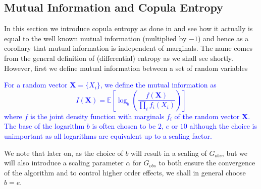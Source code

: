 \documentclass[../Thesis.tex]{subfiles}
\begin{document}
\subsection{Mutual Information and Copula Entropy}
In this section we introduce copula entropy as done in \cite{Nonparametric-copula-entropy-and-network-deconvolution-method-for-causal-discovery-in-complex-manufacturing-systems} and see how it actually is equal to the well known mutual information (multiplied by $-1$) and hence as a corollary that mutual information is independent of marginals. The name comes from the general definition of (differential) entropy as we shall see shortly. However, first we define mutual information between a set of random variables
\textcolor{blue}{
    \begin{definition}\label{def:mutual information}
        For a random vector $\boldsymbol{X} = \{X_i\}$, we define the mutual information as
        $$I(\boldsymbol{X}) = \mathbb{E}\left[\log_b \left(\frac{f(\boldsymbol X)}{\prod_i f_i (X_i)}\right)\right]$$
        where $f$ is the joint density function with marginals $f_i$ of the random vector $\boldsymbol{X}$.
        The base of the logarithm $b$ is often chosen to be $2$, $e$ or $10$ although the choice is unimportant as all logarithms are equivalent up to a scaling factor.
    \end{definition}
}
We note that later on, as the choice of $b$ will result in a scaling of $G_{obs}$, but we will also introduce a scaling parameter $\alpha$ for $G_{obs}$ to both ensure the convergence of the algorithm and to control higher order effects, we shall in general choose $b = e$.
\end{document}
